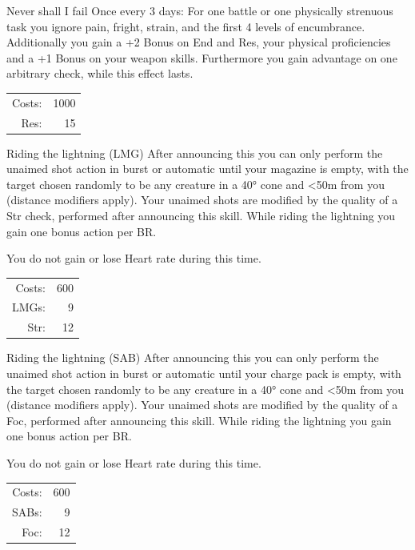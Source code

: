 \begin{skill}{Never shall I fail}
	\setlength{\parskip}{8pt}
	\setlength{\parindent}{0pt}
	Once every 3 days: For one battle or one physically strenuous task you ignore pain, fright, strain, and the first 4 levels of encumbrance. Additionally you gain a +2 Bonus on End and Res, your physical proficiencies and a +1 Bonus on your weapon skills. Furthermore you gain advantage on one arbitrary check, while this effect lasts.\\

	\hfill
	\begin{tabular}{rr}
		Costs: & 1000 \\
		Res: & 15 \\
	\end{tabular}
\end{skill}

\begin{skill}{Riding the lightning (LMG)}
	\setlength{\parskip}{8pt}
	\setlength{\parindent}{0pt}
	After announcing this you can only perform the unaimed shot action in burst or automatic until your magazine is empty, with the target chosen randomly to be any creature in a 40° cone and <50m from you (distance modifiers apply). Your unaimed shots are modified by the quality of a Str check, performed after announcing this skill. While riding the lightning you gain one bonus action per BR.

	You do not gain or lose Heart rate during this time.\\

	\hfill
	\begin{tabular}{rr}
		Costs: & 600 \\
		LMGs: & 9 \\
		Str: & 12 \\
	\end{tabular}
\end{skill}

\begin{skill}{Riding the lightning (SAB)}
	\setlength{\parskip}{8pt}
	\setlength{\parindent}{0pt}
	After announcing this you can only perform the unaimed shot action in burst or automatic until your charge pack is empty, with the target chosen randomly to be any creature in a 40° cone and <50m from you (distance modifiers apply). Your unaimed shots are modified by the quality of a Foc, performed after announcing this skill. While riding the lightning you gain one bonus action per BR.

	You do not gain or lose Heart rate during this time.\\

	\hfill
	\begin{tabular}{rr}
		Costs: & 600 \\
		SABs: & 9 \\
		Foc: & 12 \\
	\end{tabular}
\end{skill}


